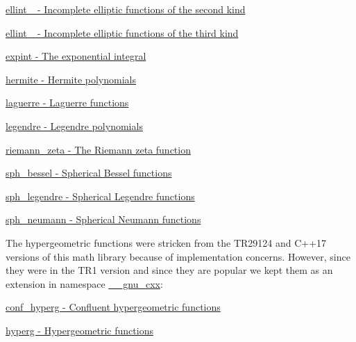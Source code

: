\begin{DoxyItemize}
\item \hyperlink{group__cxx17__math__spec__func_gad64cb9babb7837d585912b1a94b2cb7d}{ellint\+\_ -\/ Incomplete elliptic functions of the second kind}
\item \hyperlink{group__cxx17__math__spec__func_gaac0240d1e7e401e652b9d1adf4c7e029}{ellint\+\_ -\/ Incomplete elliptic functions of the third kind}
\item \hyperlink{group__cxx17__math__spec__func_ga0e9ac717a106ef54184b5f058c451782}{expint -\/ The exponential integral}
\item \hyperlink{group__cxx17__math__spec__func_ga8bd1626f1e3f7256c4fd13579f881183}{hermite -\/ Hermite polynomials}
\item \hyperlink{group__cxx17__math__spec__func_ga9d7b24a11dad27690387405548973ef9}{laguerre -\/ Laguerre functions}
\item \hyperlink{group__cxx17__math__spec__func_gad06811f4e139b0ba84235c1f0d34d86e}{legendre -\/ Legendre polynomials}
\item \hyperlink{group__cxx17__math__spec__func_gac4ef9d52ee583c77937c3a420b7c72ca}{riemann\+\_\+zeta -\/ The Riemann zeta function}
\item \hyperlink{group__cxx17__math__spec__func_gad125841d7c85e461cb8954952e3a17c8}{sph\+\_\+bessel -\/ Spherical Bessel functions}
\item \hyperlink{group__cxx17__math__spec__func_gacef0d41a7ce572a9ace3437498794ed0}{sph\+\_\+legendre -\/ Spherical Legendre functions}
\item \hyperlink{group__cxx17__math__spec__func_ga01cdd716aaca8ff3c08f307800fd5220}{sph\+\_\+neumann -\/ Spherical Neumann functions}
\end{DoxyItemize}

The hypergeometric functions were stricken from the T\+R29124 and C++17 versions of this math library because of implementation concerns. However, since they were in the T\+R1 version and since they are popular we kept them as an extension in namespace {\ttfamily \hyperlink{namespace____gnu__cxx}{\+\_\+\+\_\+gnu\+\_\+cxx}\+:} 
\begin{DoxyItemize}
\item \hyperlink{group__gnu__math__spec__func_ga4d01e85e7d295afca5d9f8b6c68f19cc}{conf\+\_\+hyperg -\/ Confluent hypergeometric functions}
\item \hyperlink{group__gnu__math__spec__func_ga374198e4076f9e23f3878ca3af70e6da}{hyperg -\/ Hypergeometric functions}
\end{DoxyItemize}

